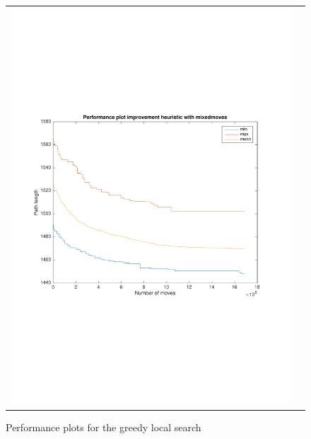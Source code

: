 \documentclass[a4paper, 11pt]{scrartcl}
\begin{document}
\begin{figure}[!ht]
\begin{tabular}{cc}
    \includegraphics[scale=0.4, trim={3cm 6cm 1cm 6cm}]{../figures/perfPlot_mixed.pdf}
  \end{tabular}
  \caption{Performance plots for the greedy local search}
  \label{fig:perfPlot-GLS}
\end{figure}
\end{document}
